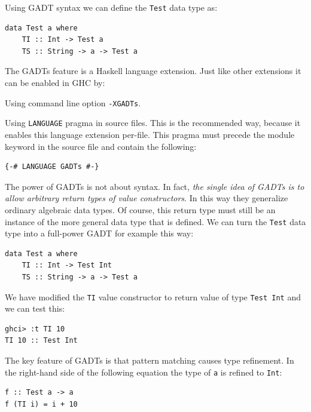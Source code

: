 \documentclass{tmr}
\newcommand{\italic}[1]{\textit{#1}}
\begin{document}
Using GADT syntax we can define the \verb|Test| data type as:

\begin{Verbatim}
data Test a where
    TI :: Int -> Test a
    TS :: String -> a -> Test a
\end{Verbatim}

The GADTs feature is a Haskell language extension. Just like other extensions it can be enabled in GHC by:

\begin{longenum}

\item Using command line option \verb|-XGADTs|.

\item Using \verb|LANGUAGE| pragma in source files. This is the recommended way, because it enables this language extension per-file. This pragma must precede the module keyword in the source file and contain the following:
\begin{Verbatim}
{-# LANGUAGE GADTs #-}
\end{Verbatim}

\end{longenum}

The power of GADTs is not about syntax. In fact, \italic{the single idea of GADTs is to allow arbitrary return types of value constructors}. In this way they generalize ordinary algebraic data types. Of course, this return type must still be an instance of the more general data type that is defined. We can turn the \verb|Test| data type into a full-power GADT for example this way:

\begin{Verbatim}
data Test a where
    TI :: Int -> Test Int
    TS :: String -> a -> Test a
\end{Verbatim}

We have modified the \verb|TI| value constructor to return value of type \verb|Test Int| and we can test this:

\begin{Verbatim}
ghci> :t TI 10
TI 10 :: Test Int
\end{Verbatim}

The key feature of GADTs is that pattern matching causes type refinement. In the right-hand side of the following equation the type of \verb|a| is refined to \verb|Int|:

\begin{Verbatim}
f :: Test a -> a
f (TI i) = i + 10
\end{Verbatim}
\end{document}
